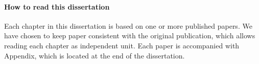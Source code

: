 \paragraph{How to read this dissertation}
Each chapter in this dissertation is based on one or more published papers.
We have chosen to keep paper consistent with the original publication, which allows reading each chapter as independent unit. 
Each paper is accompanied with Appendix, which is located at the end of the dissertation.


